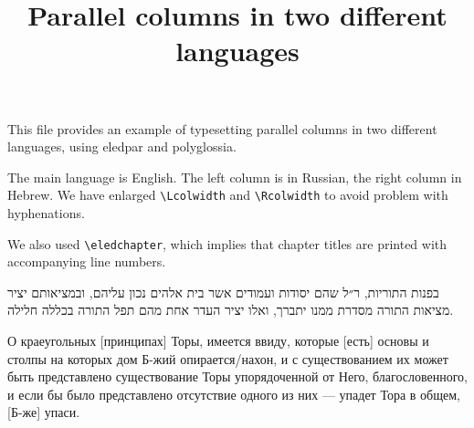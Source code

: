 \documentclass{book}
\begin{document}
\title{Parallel columns in two different languages}



{\let\newpage\relax\maketitle}
{\small
This file provides an example of typesetting parallel columns in two different languages, using eledpar and polyglossia.

The main language is English. The left column is in Russian, the right column in Hebrew.
We have enlarged \verb+\Lcolwidth+ and  \verb+\Rcolwidth+ to avoid problem with hyphenations.

We also used \verb+\eledchapter+, which implies that chapter titles are printed with accompanying line numbers. 
}



\begin{pairs}

\begin{Rightside} 
\begin{RTL}
\begin{hebrew}
\beginnumbering
\pstart
{}
\pend
\pstart
בפנות התוריות, ר״ל שהם יסודות ועמודים אשר בית אלהים נכון עליהם, ובמציאותם יציר מציאות התורה מסדרת ממנו יתברך, ואלו יציר העדר אחת מהם תפל התורה בכללה חלילה.
\pend    
\endnumbering
\end{hebrew}
\end{RTL}
\end{Rightside}




\begin{Leftside} 
\begin{russian}
\beginnumbering
\pstart
{}   
\pend 
\pstart
О краеугольных [принципах] Торы, имеется ввиду, которые [есть] основы и столпы на которых дом Б-жий опирается/нахон, и с существованием их может быть представлено существование Торы упорядоченной от Него, благословенного, и если бы было представлено отсутствие одного из них — упадет Тора в общем, [Б-же] упаси.
\pend
\endnumbering
\end{russian}
\end{Leftside}
\Columns
\end{pairs}
\end{document}
